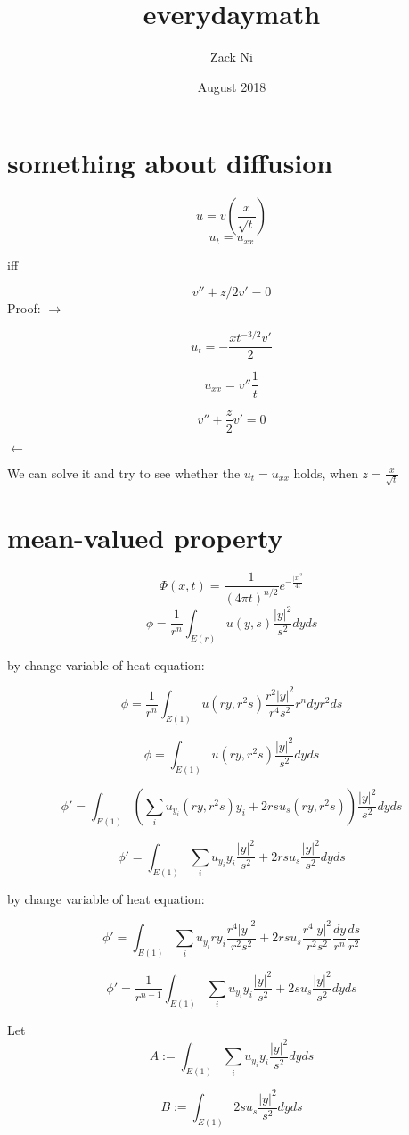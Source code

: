 \documentclass{article}
\title{everydaymath}
\author{Zack Ni }
\date{August 2018}
\begin{document}
\maketitle

\section{something about diffusion}

$$u = v(\frac{x}{\sqrt t})$$
$$u_t = u_{xx}$$

iff

$$v'' + z/2 v' =0$$
Proof:
$\rightarrow$

$$u_t =  -\frac{xt^{-3/2}v'}{2}$$

$$u_{xx} = v'' \frac{1}{t}$$

$$v''+\frac{z}{2} v' = 0$$

$\leftarrow$

We can solve it and try to see whether the $u_t = u_{xx}$ holds, when $z=\frac{x}{\sqrt t}$

\section{mean-valued property}

$$\Phi(x,t) = \frac{1}{(4\pi t)^{n/2}} e^{-\frac{|x|^2}{4t}}$$
$$\phi = \frac{1}{r^n} \int_{E(r)} u(y,s) \frac{|y|^2}{s^2} dy ds$$

by change variable of heat equation:

$$\phi =   \frac{1}{r^n} \int_{E(1)} u(ry,r^2s) \frac{r^2 |y|^2}{r^4 s^2} r^n dy r^2 ds$$

$$\phi =   \int_{E(1)} u(ry,r^2s) \frac{ |y|^2}{s^2}  dy  ds$$

$$\phi' =  \int_{E(1)} (\sum_{i} u_{y_i}(ry,r^2s) y_i+2rs u_s(ry,r^2s)) \frac{ |y|^2}{s^2}  dy  ds$$

$$\phi' =  \int_{E(1)} \sum_{i} u_{y_i} y_i \frac{ |y|^2}{s^2}+2rs u_s \frac{ |y|^2}{s^2} dy  ds$$

by change variable of heat equation:

$$\phi' =  \int_{E(1)} \sum_{i} u_{y_i} ry_i \frac{r^4 |y|^2}{r^2s^2}+2rs u_s \frac{ r^4|y|^2}{r^2s^2} \frac{dy}{r^n}  \frac{ds}{r^{2}}$$

$$\phi' =  \frac{1}{r^{n-1}}\int_{E(1)} \sum_{i} u_{y_i} y_i \frac{ |y|^2}{s^2}+2s u_s \frac{ |y|^2}{s^2} dy  ds$$

Let $$A:= \int_{E(1)} \sum_{i} u_{y_i} y_i \frac{ |y|^2}{s^2}dy  ds$$

$$B:= \int_{E(1)} 2s u_s \frac{ |y|^2}{s^2} dy  ds$$
\end{document}
